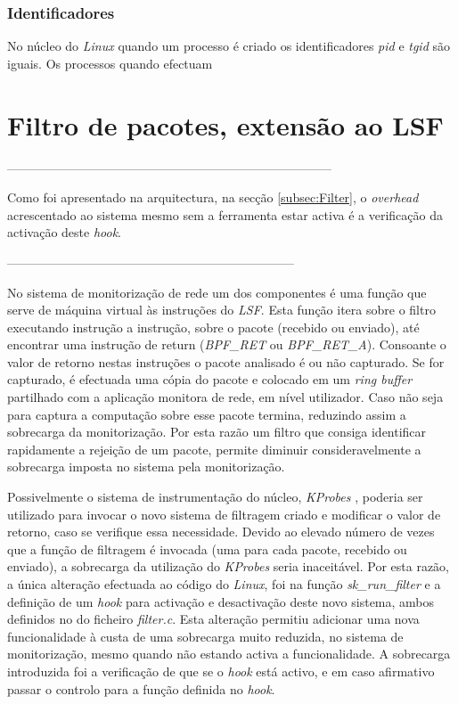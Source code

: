 \subsubsection{Identificadores}

No núcleo do \textit{Linux} quando um processo é criado os identificadores \textit{pid} e \textit{tgid} são iguais.
Os processos quando efectuam



\section{Filtro de pacotes, extensão ao LSF}
------------------------------------------------------------------------------

Como foi apresentado na arquitectura, na secção \ref{subsec:Filter}, o \textit{overhead} acrescentado ao sistema mesmo sem a ferramenta estar activa é
a verificação da activação deste \textit{hook}.

---------------------------------------------------------------------

No sistema de monitorização de rede um dos componentes é uma função que serve de máquina virtual às instruções do \textit{LSF}.
Esta função itera sobre o filtro executando instrução a instrução, sobre o pacote (recebido ou enviado), até encontrar uma instrução de return (\textit{BPF\_RET} ou \textit{BPF\_RET\_A}).
Consoante o valor de retorno nestas instruções o pacote analisado é ou não capturado.
Se for capturado, é efectuada uma cópia do pacote e colocado em um \textit{ring buffer} partilhado com a aplicação monitora de rede, em nível utilizador.
Caso não seja para captura a computação sobre esse pacote termina, reduzindo assim a sobrecarga da monitorização.
Por esta razão um filtro que consiga identificar rapidamente a rejeição de um pacote, permite diminuir consideravelmente a sobrecarga imposta no sistema pela monitorização.

Possivelmente o sistema de instrumentação do núcleo, \textit{KProbes} , poderia ser utilizado para invocar o novo sistema de filtragem criado e modificar o valor de retorno, caso se verifique essa necessidade.
Devido ao elevado número de vezes que a função de filtragem é invocada (uma para cada pacote, recebido ou enviado), a sobrecarga da utilização do \textit{KProbes} seria inaceitável.
Por esta razão, a única alteração efectuada ao código do \textit{Linux}, foi na função \textit{sk\_run\_filter} e a definição de um \textit{hook} para activação e desactivação deste novo sistema, ambos definidos no do ficheiro \textit{filter.c}.
Esta alteração permitiu adicionar uma nova funcionalidade à custa de uma sobrecarga muito reduzida, no sistema de monitorização, mesmo quando não estando activa a funcionalidade.
A sobrecarga introduzida foi a verificação de que se o \textit{hook} está activo, e em caso afirmativo passar o controlo para a função definida no \textit{hook}.



